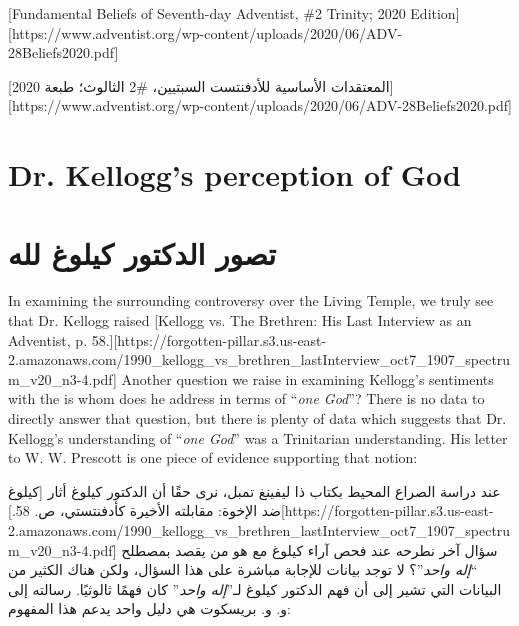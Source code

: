 [Fundamental Beliefs of Seventh-day Adventist, \#2 Trinity; 2020 Edition][https://www.adventist.org/wp-content/uploads/2020/06/ADV-28Beliefs2020.pdf]


[المعتقدات الأساسية للأدفنتست السبتيين، \#2 الثالوث؛ طبعة 2020][https://www.adventist.org/wp-content/uploads/2020/06/ADV-28Beliefs2020.pdf]


\section*{Dr. Kellogg's perception of God}


\section*{تصور الدكتور كيلوغ لله}


In examining the surrounding controversy over the Living Temple, we truly see that Dr. Kellogg raised [Kellogg vs. The Brethren: His Last Interview as an Adventist, p. 58.][https://forgotten-pillar.s3.us-east-2.amazonaws.com/1990\_kellogg\_vs\_brethren\_lastInterview\_oct7\_1907\_spectrum\_v20\_n3-4.pdf] Another question we raise in examining Kellogg's sentiments with the  is whom does he address in terms of “\textit{one God}”? There is no data to directly answer that question, but there is plenty of data which suggests that Dr. Kellogg's understanding of “\textit{one God}” was a Trinitarian understanding. His letter to W. W. Prescott is one piece of evidence supporting that notion:


عند دراسة الصراع المحيط بكتاب ذا ليفينغ تمبل، نرى حقًا أن الدكتور كيلوغ أثار [كيلوغ ضد الإخوة: مقابلته الأخيرة كأدفنتستي، ص. 58.][https://forgotten-pillar.s3.us-east-2.amazonaws.com/1990\_kellogg\_vs\_brethren\_lastInterview\_oct7\_1907\_spectrum\_v20\_n3-4.pdf] سؤال آخر نطرحه عند فحص آراء كيلوغ مع  هو من يقصد بمصطلح “\textit{إله واحد}”؟ لا توجد بيانات للإجابة مباشرة على هذا السؤال، ولكن هناك الكثير من البيانات التي تشير إلى أن فهم الدكتور كيلوغ لـ”\textit{إله واحد}” كان فهمًا ثالوثيًا. رسالته إلى و. و. بريسكوت هي دليل واحد يدعم هذا المفهوم:


